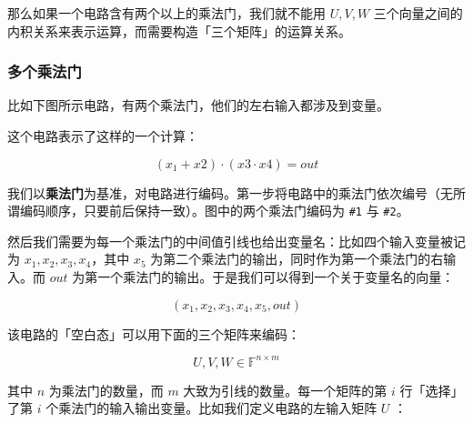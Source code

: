 那么如果一个电路含有两个以上的乘法门，我们就不能用 \(U,V,W\)
三个向量之间的内积关系来表示运算，而需要构造「三个矩阵」的运算关系。

\hypertarget{ux591aux4e2aux4e58ux6cd5ux95e8}{%
\subsubsection{多个乘法门}\label{ux591aux4e2aux4e58ux6cd5ux95e8}}

比如下图所示电路，有两个乘法门，他们的左右输入都涉及到变量。


这个电路表示了这样的一个计算：

\[
(x_1 + x2) \cdot (x3 \cdot x4) = out
\]

我们以\textbf{乘法门}为基准，对电路进行编码。第一步将电路中的乘法门依次编号（无所谓编码顺序，只要前后保持一致）。图中的两个乘法门编码为
\texttt{\#1} 与 \texttt{\#2}。

然后我们需要为每一个乘法门的中间值引线也给出变量名：比如四个输入变量被记为
\(x_1, x_2, x_3, x_4\)，其中 \(x_5\)
为第二个乘法门的输出，同时作为第一个乘法门的右输入。而 \(out\)
为第一个乘法门的输出。于是我们可以得到一个关于变量名的向量：

\[
(x_1, x_2, x_3, x_4, x_5, out)
\]

该电路的「空白态」可以用下面的三个矩阵来编码：

\[
U, V, W \in \mathbb{F}^{n\times m}
\]

其中 \(n\) 为乘法门的数量，而 \(m\) 大致为引线的数量。每一个矩阵的第
\(i\) 行「选择」了第 \(i\)
个乘法门的输入输出变量。比如我们定义电路的左输入矩阵 \(U\) ：




